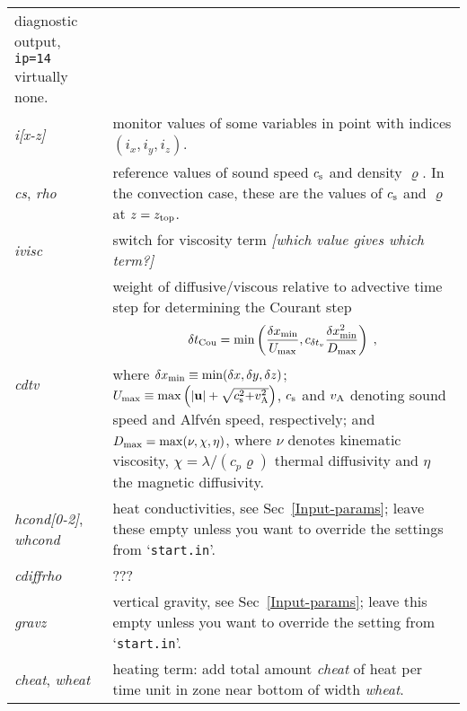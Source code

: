 \documentclass[12pt,twoside,notitlepage,a4paper]{article}
\makeatletter
\newcommand{\Note}[1]{\emph{[#1]}}
\newcommand{\code}[1]{\texttt{#1}}
\newcommand{\var}[1]{\textsl{#1}\index{#1@\emph{#1}}\/}
\newcommand{\file}[1]{`\texttt{#1}'}
\newcommand{\vekt}[1] {\mathbf{#1}}
\newcommand{\cs}            {c_{\rm s}}
\newcommand{\uv}            {\vekt{u}}
\newcommand{\vA}            {v_{\rm A}}
\makeatother
\begin{document}
\begin{longtable}{lp{}}
                 diagnostic output, \code{ip=14} virtually none. \\
  \var{i[x-z]} & monitor values of some variables in point with indices
                 $(i_x,i_y,i_z)$. \\
  \var{cs}, \var{rho}
               & reference values of sound speed $\cs$ and density
                 $\varrho$. In the convection case, these are the values of
                 $\cs$ and $\varrho$ at $z=z_{\rm top}$. \\
  \var{ivisc}  & switch for viscosity term
                 \Note{which value gives which term?} \\
  \var{cdtv}   & weight of diffusive/viscous relative to advective time
                 step for determining the Courant step
                 \begin{equation}
                   \delta t_{\rm Cou}
                   = \min\left( \frac{\delta x_{\rm min}}
                                     {U_{\rm max}} ,
                                c_{\delta t_v}
                                \frac{\delta x_{\rm min}^2}
                                     {D_{\rm max}}
                         \right) \; ,
                 \end{equation}
                 where
                 $\delta x_{\rm min} \equiv \min(\delta x, \delta y, \delta z)$;
                 $U_{\rm max} \equiv \max\left(|\uv|
                                     + \sqrt{\cs^2{+}\vA^2}\right)$,
                 $\cs$ and $\vA$ denoting sound speed and Alfv\'en speed,
                 respectively;
                 and $D_{\rm max} = \max(\nu,\chi,\eta)$, where
                 $\nu$ denotes kinematic viscosity,
                 $\chi = \lambda/(c_p\varrho)$ thermal diffusivity and
                 $\eta$ the magnetic diffusivity.
                 \\
  \var{hcond[0-2]}, \var{whcond}
               & heat conductivities, see Sec~\ref{Input-params}; leave
                 these empty unless you want to override the settings from
                 \file{start.in}. \\
  \var{cdiffrho}
               & ??? \\
  \var{gravz}  & vertical gravity, see Sec~\ref{Input-params}; leave
                 this empty unless you want to override the setting from
                 \file{start.in}. \\
  \var{cheat}, \var{wheat}
               & heating term: add total amount \var{cheat} of heat per
                 time unit in zone near bottom of width \var{wheat}.

\end{longtable}
\end{document}
